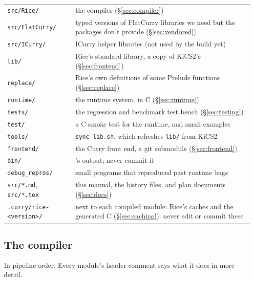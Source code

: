 \documentclass[11pt]{article}
\newcommand{\code}[1]{\texttt{\detokenize{#1}}}
\newcommand{\file}[1]{\nolinkurl{#1}}
\begin{document}
\begin{longtable}{@{}p{}p{}@{}}
\toprule
\file{src/Rice/} & the compiler (\S\ref{sec:compiler}) \\
\file{src/FlatCurry/} & typed versions of FlatCurry libraries we need but
  the packages don't provide (\S\ref{sec:vendored}) \\
\file{src/ICurry/} & ICurry helper libraries (not used by the build yet) \\
\file{lib/} & Rice's standard library, a copy of KiCS2's
  (\S\ref{sec:frontend}) \\
\file{replace/} & Rice's own definitions of some Prelude functions
  (\S\ref{sec:replace}) \\
\file{runtime/} & the runtime system, in C (\S\ref{sec:runtime}) \\
\file{tests/} & the regression and benchmark test bench (\S\ref{sec:testing}) \\
\file{test/} & a C smoke test for the runtime, and small examples \\
\file{tools/} & \file{sync-lib.sh}, which refreshes \file{lib/} from KiCS2 \\
\file{frontend/} & the Curry front end, a git submodule (\S\ref{sec:frontend}) \\
\file{bin/} & \code{make frontend}'s output; never commit it \\
\file{debug_repros/} & small programs that reproduced past runtime bugs \\
\file{src/*.md}, \file{src/*.tex} & this manual, the history files, and
  plan documents (\S\ref{sec:docs}) \\
\midrule
\file{.curry/rice-<version>/} & next to each compiled module: Rice's caches and the
  generated C (\S\ref{sec:caching}); never edit or commit these \\
\bottomrule
\end{longtable}

\subsection{The compiler}

In pipeline order.  Every module's header comment says what it does in more
detail.
\end{document}
